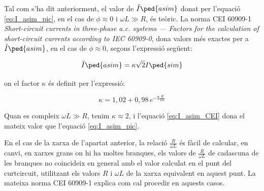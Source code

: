 Tal com s'ha dit anteriorment, el valor de $\hat{I}\ped{asim}$ donat per l'equació \eqref{eq:I_asim_pic}, en el cas de $\phi \approx 0$ i $\omega L\gg R$, és teòric. La norma CEI 60909-1 \textit{Short-circuit currents in three-phase a.c. systems ---  Factors for the calculation of short-circuit currents according to IEC 60909-0}, dona valors més exactes per a $\hat{I}\ped{asim}$, en el cas de $\phi \approx 0$, segons l'expressió següent:

\begin{equation}
    \hat{I}\ped{asim} = \kappa \sqrt{2} I\ped{sim} \label{eq:I_asim_CEI}
\end{equation}

on el factor $\kappa$ és definit per l'expressió:

\begin{equation}
    \kappa = 1{,}02 + 0{,}98 \,e^{-3\frac{R}{\omega L}}\label{eq:kappa_CEI}
\end{equation}

Quan es compleix $\omega L\gg R$, tenim $\kappa \approx 2$, i l'equació \eqref{eq:I_asim_CEI} dona el mateix valor que l'equació \eqref{eq:I_asim_pic}.

En el cas de la xarxa de l'apartat anterior, la relació $\frac{R}{\omega L}$ és fàcil de  calcular, en canvi, en xarxes grans on hi ha moltes branques, els valors de $\frac{R}{\omega L}$ de cadascuna de les branques no coincideix en general amb el valor calculat en el punt del curtcircuit, utilitzant els valors $R$ i $\omega L$ de la xarxa equivalent en aquest punt. La mateixa norma CEI 60909-1 explica com cal procedir en aquests casos.


